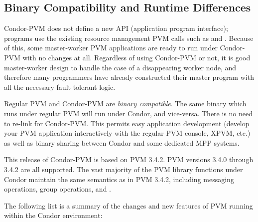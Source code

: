 \subsection{Binary Compatibility and Runtime Differences}

Condor-PVM does not define a new API (application program interface);
programs use the existing resource management PVM calls such
as  and .  Because of this, some
master-worker PVM applications are ready to run under Condor-PVM with no
changes at all.  Regardless of using Condor-PVM or not, it is good
master-worker design to handle the case of a disappearing worker node,
and therefore many programmers have already constructed their master program
with all the necessary fault tolerant logic.

Regular PVM and Condor-PVM are \emph{binary compatible}.
The same binary which runs under regular PVM will run
under Condor, and vice-versa.  There is no need to re-link for Condor-PVM.
This permits easy application development
(develop your PVM application interactively with the regular PVM console, XPVM,
etc.) as well as binary sharing between Condor and some dedicated MPP systems.

This release of Condor-PVM is based on PVM 3.4.2.  PVM versions 
3.4.0 through 3.4.2 are all supported.  The vast majority of the PVM
library functions under Condor maintain the same semantics as in
PVM 3.4.2, including messaging operations, group operations, and 
.

The following list
is a summary of the changes and new features of PVM running within the
Condor environment:

